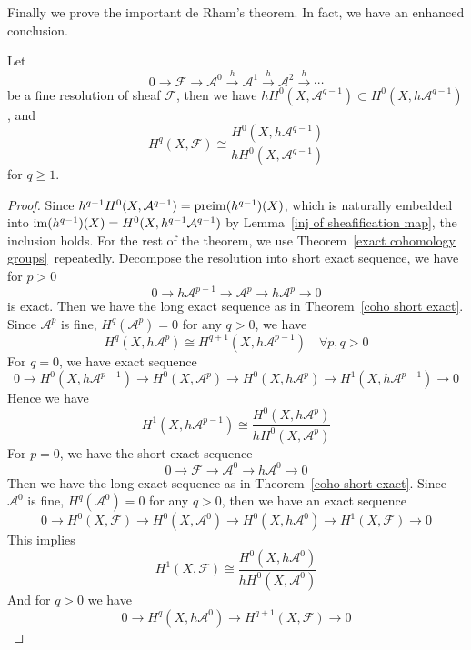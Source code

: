 Finally we prove the important de Rham's theorem.
In fact, we have an enhanced conclusion.
\begin{thm}\label{fine de rham}
    Let
    \[0\to\mathcal{F}\to\mathcal{A}^0\xrightarrow{h}\mathcal{A}^1\xrightarrow{h}\mathcal{A}^2\xrightarrow{h}\cdots\]
    be a fine resolution of sheaf $\mathcal{F}$, then we have $hH^0(X,\mathcal{A}^{q-1})\subset H^0(X,h\mathcal{A}^{q-1})$, and
    \[H^q(X,\mathcal{F})\cong\frac{H^0(X,h\mathcal{A}^{q-1})}{hH^0(X,\mathcal{A}^{q-1})}\]
    for $q\geq 1$.
\end{thm}
\begin{proof}
    Since $h^{q-1}H^0(X,\mathcal{A}^{q-1})=\operatorname{preim}(h^{q-1})(X)$, which is naturally embedded into $\operatorname{im}(h^{q-1})(X)=H^0(X,h^{q-1}\mathcal{A}^{q-1})$ by Lemma~\ref{inj of sheafification map}, the inclusion holds.
    For the rest of the theorem, we use Theorem~\ref{exact cohomology groups}~repeatedly.
    Decompose the resolution into short exact sequence, we have for $p>0$
    \[0\to h\mathcal{A}^{p-1}\to\mathcal{A}^p\to h\mathcal{A}^p\to 0\]
    is exact.
    Then we have the long exact sequence as in Theorem~\ref{coho short exact}.
    Since $\mathcal{A}^p$ is fine, $H^q(\mathcal{A}^p)=0$ for any $q>0$, we have
    \begin{equation}
        H^q(X,h\mathcal{A}^p)\cong H^{q+1}(X,h\mathcal{A}^{p-1})\quad \forall p,q>0\label{de rham 1}
    \end{equation}
    For $q=0$, we have exact sequence
    \[0\to H^0(X,h\mathcal{A}^{p-1})\to H^0(X,\mathcal{A}^p)\to H^0(X,h\mathcal{A}^p)\to H^1(X,h\mathcal{A}^{p-1})\to 0\]
    Hence we have
    \begin{equation}
        H^1(X,h\mathcal{A}^{p-1})\cong\frac{H^0(X,h\mathcal{A}^p)}{hH^0(X,\mathcal{A}^p)}\label{de rham 2}
    \end{equation}
    For $p=0$, we have the short exact sequence
    \[0\to\mathcal{F}\to\mathcal{A}^0\to h\mathcal{A}^0\to 0\]
    Then we have the long exact sequence as in Theorem~\ref{coho short exact}.
    Since $\mathcal{A}^0$ is fine, $H^q(\mathcal{A}^0)=0$ for any $q>0$, then we have an exact sequence
    \[0\to H^0(X,\mathcal{F})\to H^0(X,\mathcal{A}^0)\to H^0(X,h\mathcal{A}^0)\to H^1(X,\mathcal{F})\to 0\]
    This implies
    \begin{equation}
        H^1(X,\mathcal{F})\cong\frac{H^0(X,h\mathcal{A}^0)}{hH^0(X,\mathcal{A}^0)}\label{de rham 3}
    \end{equation}
    And for $q>0$ we have
    \[0\to H^q(X,h\mathcal{A}^0)\to H^{q+1}(X,\mathcal{F})\to 0\]

\end{proof}
